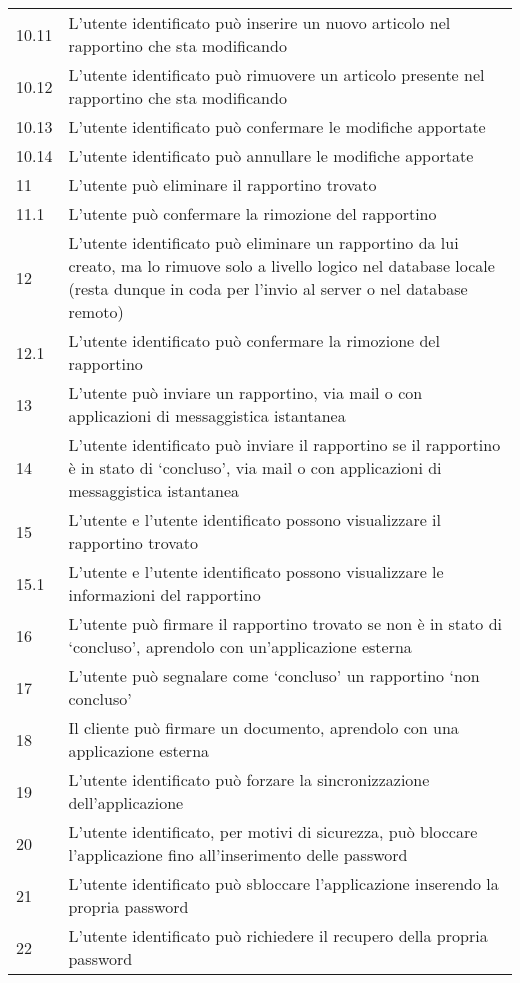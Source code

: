 \begin{longtable}{||p{} p{10.55cm}||}
		10.11 & L’utente identificato può inserire un nuovo articolo nel rapportino che sta modificando\\
		10.12 & L’utente identificato può rimuovere un articolo presente nel rapportino che sta modificando\\
		10.13 & L’utente identificato può confermare le modifiche apportate\\
		10.14 & L’utente identificato può annullare le modifiche apportate\\
		\hline
		11 & L’utente può eliminare il rapportino trovato\\
		11.1 & L’utente può confermare la rimozione del rapportino\\
		\hline
		12 & L’utente identificato può eliminare un rapportino da lui creato, ma lo rimuove solo a livello logico nel database locale (resta dunque in coda per l’invio al server o nel database remoto)\\
		12.1 & L’utente identificato può confermare la rimozione del rapportino\\
		\hline
		13 & L’utente può inviare un rapportino, via mail o con applicazioni di messaggistica istantanea\\
		\hline
		14 & L’utente identificato può inviare il rapportino se il rapportino è in stato di ‘concluso’, via mail o con applicazioni di messaggistica istantanea\\
		\hline
		15 & L’utente e l’utente identificato possono visualizzare il rapportino trovato\\
		15.1 & L’utente e l’utente identificato possono visualizzare le informazioni del rapportino \\
		\hline
		16 & L’utente può firmare il rapportino trovato se non è in stato di ‘concluso’, aprendolo con un’applicazione esterna \\
		\hline
		17 & L’utente può segnalare come ‘concluso’ un rapportino ‘non concluso’\\
		\hline
		18 & Il cliente può firmare un documento, aprendolo con una applicazione esterna\\
		\hline
		19 & L’utente identificato può forzare la sincronizzazione dell’applicazione\\
		\hline
		20 & L’utente identificato, per motivi di sicurezza, può bloccare l’applicazione fino all’inserimento delle password\\
		\hline
		21 & L’utente identificato può sbloccare l’applicazione inserendo la propria password\\
		\hline
		22 & L’utente identificato può richiedere il recupero della propria password\\

\end{longtable}
